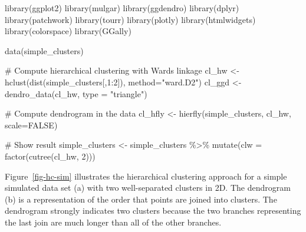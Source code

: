 \documentclass[
  letterpaper,
]{krantz}
\newenvironment{Shaded}{\begin{snugshade}}{\end{snugshade}}
\newcommand{\AttributeTok}[1]{\textcolor[rgb]{0.40,0.45,0.13}{#1}}
\newcommand{\CommentTok}[1]{\textcolor[rgb]{0.37,0.37,0.37}{#1}}
\newcommand{\ConstantTok}[1]{\textcolor[rgb]{0.56,0.35,0.01}{#1}}
\newcommand{\DecValTok}[1]{\textcolor[rgb]{0.68,0.00,0.00}{#1}}
\newcommand{\FunctionTok}[1]{\textcolor[rgb]{0.28,0.35,0.67}{#1}}
\newcommand{\NormalTok}[1]{\textcolor[rgb]{0.00,0.23,0.31}{#1}}
\newcommand{\OtherTok}[1]{\textcolor[rgb]{0.00,0.23,0.31}{#1}}
\newcommand{\SpecialCharTok}[1]{\textcolor[rgb]{0.37,0.37,0.37}{#1}}
\newcommand{\StringTok}[1]{\textcolor[rgb]{0.13,0.47,0.30}{#1}}
\begin{document}

\begin{Shaded}
\begin{Highlighting}[]
\FunctionTok{library}\NormalTok{(ggplot2)}
\FunctionTok{library}\NormalTok{(mulgar)}
\FunctionTok{library}\NormalTok{(ggdendro)}
\FunctionTok{library}\NormalTok{(dplyr)}
\FunctionTok{library}\NormalTok{(patchwork)}
\FunctionTok{library}\NormalTok{(tourr)}
\FunctionTok{library}\NormalTok{(plotly)}
\FunctionTok{library}\NormalTok{(htmlwidgets)}
\FunctionTok{library}\NormalTok{(colorspace)}
\FunctionTok{library}\NormalTok{(GGally)}
\end{Highlighting}
\end{Shaded}

\begin{Shaded}
\begin{Highlighting}[]
\FunctionTok{data}\NormalTok{(simple\_clusters)}

\CommentTok{\# Compute hierarchical clustering with Ward\textquotesingle{}s linkage}
\NormalTok{cl\_hw }\OtherTok{\textless{}{-}} \FunctionTok{hclust}\NormalTok{(}\FunctionTok{dist}\NormalTok{(simple\_clusters[,}\DecValTok{1}\SpecialCharTok{:}\DecValTok{2}\NormalTok{]),}
                \AttributeTok{method=}\StringTok{"ward.D2"}\NormalTok{)}
\NormalTok{cl\_ggd }\OtherTok{\textless{}{-}} \FunctionTok{dendro\_data}\NormalTok{(cl\_hw, }\AttributeTok{type =} \StringTok{"triangle"}\NormalTok{)}

\CommentTok{\# Compute dendrogram in the data}
\NormalTok{cl\_hfly }\OtherTok{\textless{}{-}} \FunctionTok{hierfly}\NormalTok{(simple\_clusters, cl\_hw, }\AttributeTok{scale=}\ConstantTok{FALSE}\NormalTok{)}

\CommentTok{\# Show result}
\NormalTok{simple\_clusters }\OtherTok{\textless{}{-}}\NormalTok{ simple\_clusters }\SpecialCharTok{\%\textgreater{}\%}
  \FunctionTok{mutate}\NormalTok{(}\AttributeTok{clw =} \FunctionTok{factor}\NormalTok{(}\FunctionTok{cutree}\NormalTok{(cl\_hw, }\DecValTok{2}\NormalTok{)))}
\end{Highlighting}
\end{Shaded}

Figure~\ref{fig-hc-sim} illustrates the hierarchical clustering approach
for a simple simulated data set (a) with two well-separated clusters in
2D. The dendrogram (b) is a representation of the order that points are
joined into clusters. The dendrogram strongly indicates two clusters
because the two branches representing the last join are much longer than
all of the other branches.
\end{document}
